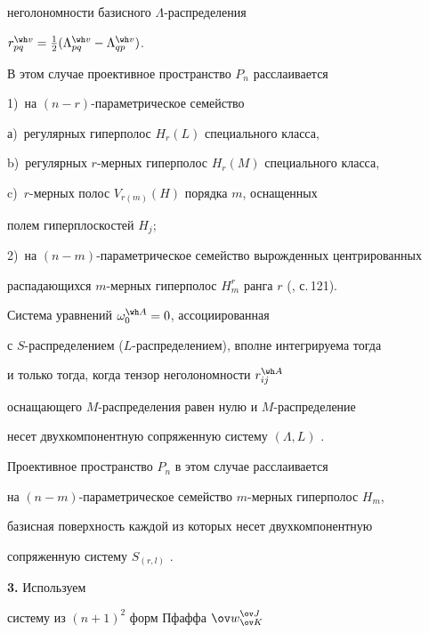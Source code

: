 неголономности базисного $\Lambda$-распределения


$r^{\wh v}_{pq}=\frac12(\Lambda^{\wh v}_{pq}-\Lambda^{\wh v}_{qp})$.


В этом случае проективное пространство $P_n$ расслаивается


1)~на $(n-r)$-параметрическое семейство


а)~регулярных гиперполос $H_r(L)$ специального класса,


b)~регулярных $r$-мерных гиперполос $H_r(M)$ специального класса,


c)~$r$-мерных полос $V_{r(m)}(H)$ порядка $m$, оснащенных


полем гиперплоскостей $H_j$;


2)~на $(n-m)$-параметрическое семейство вырожденных центрированных


распадающихся $m$-мерных гиперполос $H^r_m$ ранга $r$ (\cite{rab1}, с.\,121).


Система уравнений $\omega^{\wh A}_0=0$, ассоциированная


с $S$-распределением ($L$-распределением), вполне интегрируема тогда


и только тогда, когда тензор неголономности $r^{\wh A}_{ij}$


оснащающего $M$-распределения равен нулю и $M$-распределение


несет двухкомпонентную сопряженную систему $(\Lambda, L)$ \cite{rab2}.


Проективное пространство $P_n$ в этом случае расслаивается


на $(n-m)$-параметрическое семейство $m$-мерных гиперполос $H_m$,


базисная поверхность каждой из которых несет двухкомпонентную


сопряженную систему $S_{(r,l)}$ \cite{rab2}.


\medskip





{\bf 3.} Используем


систему из $(n+1)^2$ форм Пфаффа ${\ov w}^{\ov J}_{\ov K}$


\cite{rab5}


